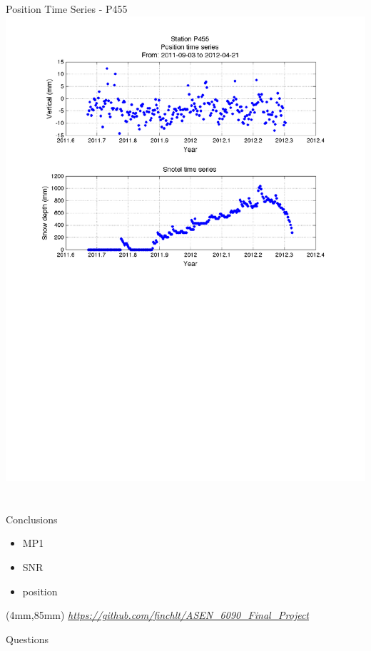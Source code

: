 \documentclass{beamer}
\newenvironment{reference}[2]{%
  \begin{textblock*}{\textwidth}(#1,#2) 
      \footnotesize\it\bgroup\color{red!50!black}}{\egroup\end{textblock*}}
\begin{document}
\begin{frame}{Position Time Series - P455}
  \includegraphics[width=1\linewidth,trim=50 0 50 20, clip=true]{logan/p455_snotel.pdf}
\end{frame}

\section[Conclusion]{}
\begin{frame}{Conclusions}
\begin{itemize}
 \item MP1
 \item SNR
 \item position
\end{itemize}

\begin{reference}{4mm}{85mm}
  \url{https://github.com/finchlt/ASEN_6090_Final_Project}
\end{reference}
\end{frame}

\begin{frame}
{
\vspace{60pt}
\huge
\centering
Questions\\}
\begin{center}
  
\end{center}

\end{frame}
\end{document}
